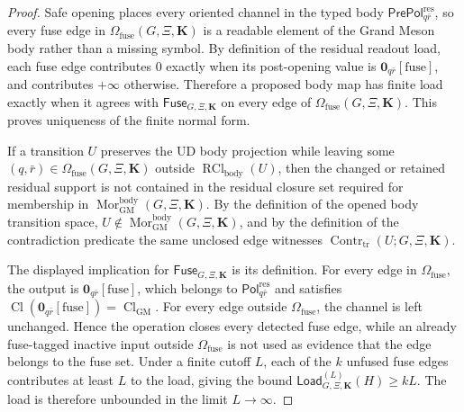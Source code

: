 \documentclass[11pt]{article}
\theoremstyle{definition}
\theoremstyle{plain}
\DeclareMathOperator{\Cl}{Cl}
\DeclareMathOperator{\Contr}{Contr}
\DeclareMathOperator{\Mor}{Mor}
\DeclareMathOperator{\RCl}{RCl}
\begin{document}
\begin{proof}
Safe opening places every oriented channel in the typed body
\(\mathsf{PrePol}^{\mathrm{res}}_{q\bar r}\), so every fuse edge in
\(\Omega_{\mathrm{fuse}}(G,\Xi,\mathbf K)\) is a readable element of the Grand
Meson body rather than a missing symbol.  By definition of the residual
readout load, each fuse edge contributes \(0\) exactly when its post-opening
value is \(\mathbf 0_{q\bar r}[\mathrm{fuse}]\), and contributes
\(+\infty\) otherwise.  Therefore a proposed body map has finite load
exactly when it agrees with \(\mathsf{Fuse}_{G,\Xi,\mathbf K}\) on every edge of
\(\Omega_{\mathrm{fuse}}(G,\Xi,\mathbf K)\).  This proves uniqueness of the
finite normal form.

If a transition \(U\) preserves the UD body projection while leaving some
\((q,\bar r)\in\Omega_{\mathrm{fuse}}(G,\Xi,\mathbf K)\) outside
\(\RCl_{\mathrm{body}}(U)\),
then the changed or retained residual support is not contained in the
residual closure set required for membership in
\(\Mor^{\mathrm{body}}_{\mathrm{GM}}(G,\Xi,\mathbf K)\).  By the definition of
the opened body transition space,
\(U\notin\Mor^{\mathrm{body}}_{\mathrm{GM}}(G,\Xi,\mathbf K)\), and by the
definition of the contradiction predicate the same unclosed edge witnesses
\(\Contr_{\mathrm{tr}}(U;G,\Xi,\mathbf K)\).

The displayed implication for \(\mathsf{Fuse}_{G,\Xi,\mathbf K}\) is its
definition.  For every edge in \(\Omega_{\mathrm{fuse}}\), the output is
\(\mathbf 0_{q\bar r}[\mathrm{fuse}]\), which belongs to
\(\mathsf{Pol}^{\mathrm{res}}_{q\bar r}\) and satisfies
\(\Cl(\mathbf 0_{q\bar r}[\mathrm{fuse}])=\Cl_{\mathrm{GM}}\).  For every
edge outside \(\Omega_{\mathrm{fuse}}\), the channel is left unchanged.
Hence the operation closes every detected fuse edge, while an already
fuse-tagged inactive input outside \(\Omega_{\mathrm{fuse}}\) is not used
as evidence that the edge belongs to the fuse set.  Under a finite cutoff
\(L\), each of the \(k\) unfused fuse edges
contributes at least \(L\) to the load, giving the bound
\(\mathsf{Load}^{(L)}_{G,\Xi,\mathbf K}(H)\ge kL\).  The load is therefore
unbounded in the limit \(L\to\infty\).
\end{proof}
\end{document}
